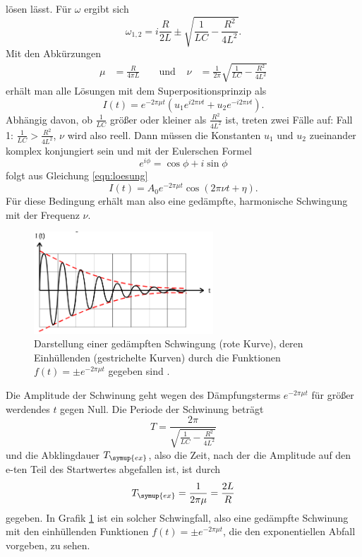 lösen lässt. Für $\omega$ ergibt sich
\begin{equation}
  \omega_{1,2} = i \frac{R}{2L}\pm \sqrt{\frac{1}{L C} - \frac{R^2}{4L^2}}.
  \label{eqn:omega12}
\end{equation}
Mit den Abkürzungen
\begin{align*}
  \mu &= \frac{R}{4 \pi L} & &\text{ und } &
  \nu &= \frac{1}{2\pi} \sqrt{\frac{1}{L C} - \frac{R^2}{4 L^2}}
\end{align*}
erhält man alle Lösungen mit dem Superpositionsprinzip als
\begin{equation}
  I(t) = e^{-2 \pi \mu t} (u_1 e^{i 2 \pi \nu t} + u_2 e^{-i 2 \pi \nu t}).
  \label{eqn:loesung}
\end{equation}
Abhängig davon, ob $\frac{1}{L C}$ größer oder kleiner als $\frac{R^2}{4L^2}$ ist,
treten zwei Fälle auf: \newline
Fall 1: $\frac{1}{L C} > \frac{R^2}{4L^2}$, $\nu$ wird also reell. Dann müssen
die Konstanten $u_1$ und $u_2$ zueinander komplex konjungiert sein und mit der
Eulerschen Formel
\begin{equation}
  e^{i\phi} = \cos{\phi} + i \sin{\phi}
  \label{eqn:euler}
\end{equation}
folgt aus Gleichung \eqref{eqn:loesung}
\begin{equation}
  I(t) = A_0 e^{-2\pi\mu t}\cos{(2\pi\nu t + \eta)}.
  \label{eqn:gedaempfte_schwingung}
\end{equation}
Für diese Bedingung erhält man also eine gedämpfte, harmonische Schwingung mit der
Frequenz $\nu$.
\begin{figure}
  \centering
  \includegraphics[width=0.6\textwidth]{gedaempfte_schwingung.png}
  \caption{Darstellung einer gedämpften Schwingung (rote Kurve), deren Einhüllenden
  (gestrichelte Kurven) durch die Funktionen $f(t)=\pm e^{-2\pi\mu t}$ gegeben
  sind \cite{sample}.}
  \label{fig:gedaempfte_schwingung}
\end{figure}
Die Amplitude der Schwinung geht wegen des Dämpfungsterms
$e^{-2\pi\mu t}$ für größer werdendes $t$ gegen Null. Die Periode der Schwinung
beträgt
\begin{equation}
  T = \frac{2\pi}{\sqrt{\frac{1}{L C}-\frac{R^2}{4 L^2}}}
  \label{eqn:periode}
\end{equation}
und die Abklingdauer $T_\symup{ex}$, also die Zeit, nach der die Amplitude auf den
e-ten Teil des Startwertes abgefallen ist, ist durch
\begin{equation}
  T_\symup{ex} = \frac{1}{2\pi\mu} = \frac{2L}{R}
  \label{eqn:abklingzeit}
\end{equation}
gegeben. In Grafik \ref{fig:gedaempfte_schwingung} ist ein solcher Schwingfall,
also eine gedämpfte Schwinung mit den einhüllenden Funktionen $f(t)=\pm e^{-2\pi\mu t}$,
die den exponentiellen Abfall vorgeben, zu sehen.


